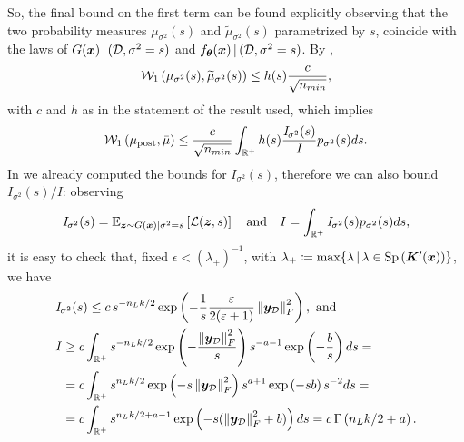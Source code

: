 So, the final bound on the first term can be found explicitly observing that the two probability measures $\mu_{\sigma^2}(s)$ and $\widetilde{\mu}_{\sigma^2}(s)$ parametrized by $s$, coincide with the laws of $G(\bm{x}) \given (\train, \sigma^2 = s)$ and $f_{\bm{\theta}}(\bm{x}) \given (\train, \sigma^2 = s)$. 
By , 
\begin{equation*}
	\wass[1]{\mu_{\sigma^2}(s)}{\widetilde{\mu}_{\sigma^2}(s)} \leq h(s) \frac{c}{\sqrt{n_{min}}},
\end{equation*}
with $c$ and $h$ as in the statement of the result used, which implies
\begin{equation} \label{eq:boundfirstterm}
	\wass[1]{\mu_{\mathrm{post}}}{\bar{\mu}} \leq \frac{c}{\sqrt{n_{min}}} \int_{\real^+} h(s) \frac{\mathit{I}_{\sigma^2}(s)}{\mathit{I}} p_{\sigma^2}(s) ds.
\end{equation}
In  we already computed the bounds for $\mathit{I}_{\sigma^2}(s)$, therefore we can also bound $\mathit{I}_{\sigma^2}(s) / \mathit{I}$: observing 
\begin{equation*}
	\mathit{I}_{\sigma^2}(s) = \mean[\bm{z} \sim G(\bm{x}) | \sigma^2 = s]{\mathcal{L}(\bm{z}, s)} \quad \text{and} \quad \mathit{I} = \int_{\real^+} \mathit{I}_{\sigma^2}(s) p_{\sigma^2}(s) ds,
\end{equation*}
it is easy to check that, fixed $\epsilon < \left(\lambda_+\right)^{-1}$, with $\lambda_+ \coloneqq \max\{\lambda \given \lambda \in \operatorname{Sp}\left(\bm{K}'(\bm{x})\right)\}$, we have
\begin{align}	
	& \begin{aligned} \nonumber
		\mathit{I}_{\sigma^2}(s) & \leq c \, s^{-n_L k / 2} \exp{-\frac{1}{s} \frac{\epsilon}{2 (\epsilon + 1)} \norm{\bm{y}_{\mathcal{D}}}_F^2}, \text{ and} \\
	\end{aligned} \\
	& \begin{aligned} \label{eq:lowerboundI}
		\mathit{I} & \geq c \int_{\real^+} s^{- n_L k / 2} \exp{-\frac{\norm{\bm{y}_{\mathcal{D}}}_F^2}{s}} s^{- a - 1} \exp{-\frac{b}{s}} ds = \\
		& = c \int_{\real^+} s^{n_L k / 2} \exp{- s \norm{\bm{y}_{\mathcal{D}}}_F^2} s^{a + 1} \exp{- s b} s^{-2} ds = \\
		& = c \int_{\real^+} s^{n_L k / 2 + a - 1} \exp{- s (\norm{\bm{y}_{\mathcal{D}}}_F^2 + b)} ds = c \, \Gamma\left(n_L k /  2 + a\right).
	\end{aligned}
\end{align}
